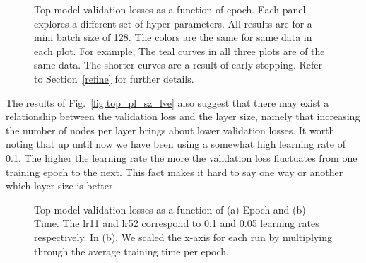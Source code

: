 \documentclass[12pt,journal,compsoc]{IEEEtran}
\begin{document}
\begin{figure}
\caption{Top model validation losses as a function of epoch. Each panel explores a different set of hyper-parameters. All results are for a mini batch size of 128. The colors are the same for same data in each plot.  For example, The teal curves in all three plots are of the same data. The shorter curves are a result of early stopping. Refer to Section~\ref{refine} for further details.}
\label{fig:top2_nl_sz_lr}
\vspace*{4pt}
\end{figure}

The results of Fig.~\ref{fig:top_pl_sz_lve} also suggest that there may exist a relationship between the validation loss and the layer size, namely that increasing the number of nodes per layer brings about lower validation losses. It worth noting that up until now we have been using a somewhat high learning rate of 0.1. The higher the learning rate the more the validation loss fluctuates from one training epoch to the next. This fact makes it hard to say one way or another which layer size is better. 

\begin{figure}%
\caption{Top model validation losses as a function of (a) Epoch and (b) Time. The lr11 and lr52 correspond to 0.1 and 0.05 learning rates respectively.  In (b), We scaled the x-axis for each run by multiplying through the average training time per epoch.}
\label{fig:top3_lr_bs}
\vspace*{4pt}
\end{figure}
\end{document}
